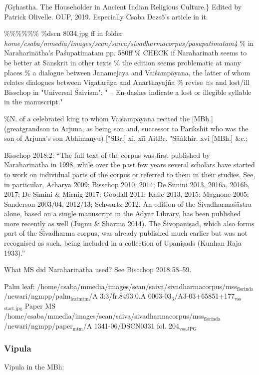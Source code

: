 \documentclass[11pt]{article}
\begin{document}
\textit\{Gṛhastha. The Householder in Ancient Indian 
Religious Culture.\} Edited by Patrick Olivelle. OUP, 2019.
Especially Csaba Dezső's article in it.

\%\%\%\%\%\%
\%dscn 8034.jpg ff in folder \emph{home/csaba/mmedia/images/scan/saiva/sivadharmacorpus/pasupatimatam4}
\% in Naraharinātha's Paśupatimatam pp. 580ff
\% CHECK if Naraharinath seems to be better at Sanskrit in other texts
\% the edition seems problematic at many places
\% a dialogue between Janamejaya and Vaiśampāyana, the latter of whom relates
dialogues between Vigatarāga and Anarthayajña
\% revise ¤s and lost/ill
Bisschop in "Universal Śaivism": " -- En-dashes indicate a lost or illegible syllable in the manuscript."

\%N. of a celebrated king to whom Vaiśampāyana recited the [MBh.] (greatgrandson to Arjuna, as being son and, successor to Parikshit who was the son of Arjuna's son Abhimanyu) ["SBr.] xi, xīi AitBr. "Sāṅkhir. xvi [MBh.] \&c.;

Bisschop 2018:2:
	``The full text of the corpus was first published by Naraharinātha in 1998, while over the past few years several scholars have started to work on individual parts of the corpus or referred to them in their studies. See, in particular, Acharya 2009; Bisschop 2010, 2014; De Simini 2013, 2016a, 2016b, 2017; De Simini \& Mirnig 2017; Goodall 2011; Kafle 2013, 2015; Magnone 2005; Sanderson 2003/04, 2012/13; Schwartz 2012. An edition of the Śivadharmaśāstra alone, based on a single manuscript in the Adyar Library, has been published more recently as well (Jugnu \& Sharma 2014). The Śivopaniṣad, which also forms part of the Śivadharma corpus, was already published much earlier but was not recognised as such, being included in a collection of Upaniṣads (Kunhan Raja 1933).''

What MS did Naraharinātha used? See Biscchop 2018:58--59.

Palm leaf: /home/csaba/mmedia/images/scan/saiva/sivadharmacorpus/mss\(_{\text{florinda}}\)/newari/ngmpp/palm\(_{\text{leaf}}\)\(_{\text{mtm}}\)/A 3:3/fr.8493.0.A 0003-03\(_{\text{3}}\)/A3-03+65851+177\(_{\text{vss}}\)\(_{\text{start.jpg}}\)
Paper MS /home/csaba/mmedia/images/scan/saiva/sivadharmacorpus/mss\(_{\text{florinda}}\)/newari/ngmpp/paper\(_{\text{mtm}}\)/A 1341-06/DSCN0331 fol. 204\(_{\text{vss.JPG}}\)
\subsubsection{Vipula}
\label{sec:org830304a}
Vipula in the MBh:
\end{document}
